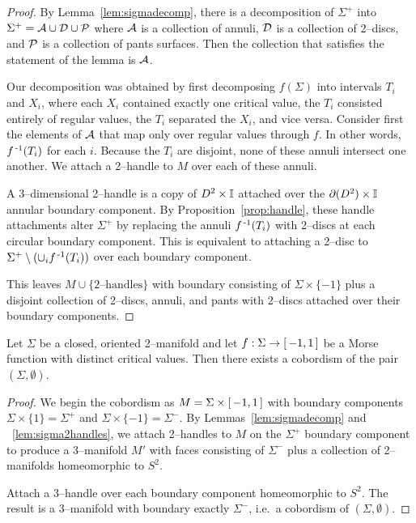 \begin{proof}
	By Lemma~\ref{lem:sigmadecomp}, there is a decomposition of $\Sigma^+$ into $\Sigma^+=\mathcal{A}\cup \mathcal{D}\cup \mathcal{P}$ where $\mathcal{A}$ is a collection of annuli, $\mathcal{D}$ is a collection of  2--discs, and $\mathcal{P}$ is a collection of pants surfaces.
	Then the collection that satisfies the statement of the lemma is $\mathcal{A}$.
	
	Our decomposition was obtained by first decomposing $f(\Sigma)$ into intervals $T_i$ and $X_i$, where each $X_i$ contained exactly one critical value, the $T_i$ consisted entirely of regular values, the $T_i$ separated the $X_i$, and vice versa.	
	Consider first the elements of $\mathcal{A}$ that map only over regular values through $f$.
	In other words, $f^{\,\text{-}1}(T_i)$ for each $i$.
	Because the $T_i$ are disjoint, none of these annuli intersect one another.
	We attach a 2--handle to $M$ over each of these annuli.
	
	A 3--dimensional 2--handle is a copy of $D^2\times\mathbb{I}$ attached over the $\partial(D^2)\times\mathbb{I}$ annular boundary component.
	By Proposition~\ref{prop:handle}, these handle attachments alter $\Sigma^+$ by replacing the annuli $f^{\,\text{-}1}(T_i)$ with 2--discs at each circular boundary component.
	This is equivalent to attaching a 2--disc to $\Sigma^+\setminus(\cup_i f^{\,\text{-}1}(T_i))$ over each boundary component.
	
	This leaves $M\cup\{\textrm{2--handles}\}$ with boundary consisting of $\Sigma\times\{-1\}$ plus a disjoint collection of 2--discs, annuli, and pants with 2--discs attached over their boundary components.	
\end{proof}

\begin{theorem}
	\label{thm:2bound3}
	Let $\Sigma$ be a closed, oriented 2--manifold and let $f:\Sigma\to[\,-1,1\,]$ be a Morse function with distinct critical values.
	Then there exists a cobordism of the pair $(\Sigma,\emptyset)$.
\end{theorem}

\begin{proof}
	We begin the cobordism as $M=\Sigma\times[\,-1,1\,]$ with boundary components $\Sigma\times\{1\}=\Sigma^+$ and $\Sigma\times\{-1\}=\Sigma^-$.
	By Lemmas~\ref{lem:sigmadecomp} and ~\ref{lem:sigma2handles}, we attach 2--handles to $M$ on the $\Sigma^+$ boundary component to produce a 3--manifold $M'$ with faces consisting of $\Sigma^-$ plus a collection of 2--manifolds homeomorphic to $S^2$.
	
	Attach a 3--handle over each boundary component homeomorphic to $S^2$.
	The result is a 3--manifold with boundary exactly $\Sigma^-$, i.e.\ a cobordism of $(\Sigma,\emptyset)$.
\end{proof}

